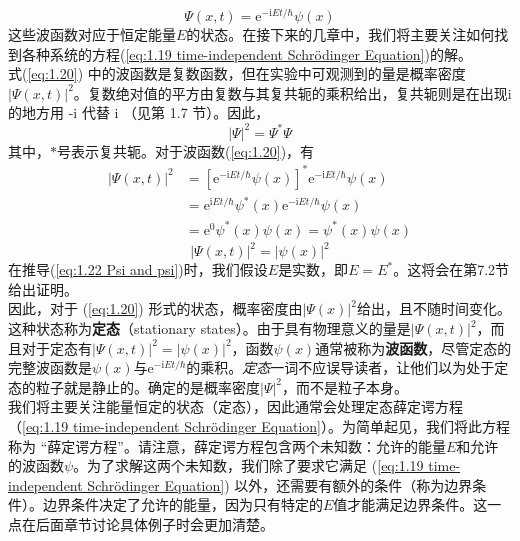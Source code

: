 	\begin{equation}
		\Psi\left(x,t\right)=\mathrm{e}^{-\mathrm{i}Et/\hbar}\psi\left(x\right)
		\label{eq:1.20}
	\end{equation}
	这些波函数对应于恒定能量$E$的状态。在接下来的几章中，我们将主要关注如何找到各种系统的方程(\ref{eq:1.19 time-independent Schrödinger Equation})的解。\\
	\indent 式(\ref{eq:1.20}) 中的波函数是复数函数，但在实验中可观测到的量是概率密度$\left|\Psi\left(x,t\right)\right|^2$。复数绝对值的平方由复数与其复共轭的乘积给出，复共轭则是在出现i的地方用 -i 代替 i （见第 1.7 节）。因此，
	\begin{equation}
		\boxed{\left|\Psi\right|^2=\Psi^{\ast}\Psi}
		\label{eq:1.21 square of Psi}
	\end{equation}
	其中，$\ast$号表示复共轭。对于波函数(\ref{eq:1.20})，有
	\begin{equation*}
		\begin{aligned}
			\left|\Psi\left(x,t\right)\right|^2 &=\left[\mathrm{e}^{-\mathrm{i}Et/\hbar}\psi\left(x\right)\right]^{\ast}\mathrm{e}^{-\mathrm{i}Et/\hbar}\psi\left(x\right)\\
			& = \mathrm{e}^{\mathrm{i}Et/\hbar}\psi^{\ast}\left(x\right)\mathrm{e}^{-\mathrm{i}Et/\hbar}\psi\left(x\right)\\
			& = \mathrm{e}^0\psi^{\ast}\left(x\right)\psi\left(x\right)=\psi^\ast\left(x\right)\psi\left(x\right)
		\end{aligned}
	\end{equation*}
	\begin{equation}
		\left|\Psi\left(x,t\right)\right|^2=\left|\psi\left(x\right)\right|^2
		\label{eq:1.22 Psi and psi}
	\end{equation}
	在推导(\ref{eq:1.22 Psi and psi})时，我们假设$E$是实数，即$E=E^{\ast}$。这将会在第7.2节给出证明。\\
	\indent 因此，对于 (\ref{eq:1.20}) 形式的状态，概率密度由$\left|\Psi\left(x\right)\right|^2$给出，且不随时间变化。这种状态称为\textbf{定态}（stationary states）。由于具有物理意义的量是$\left|\Psi\left(x,t\right)\right|^2$，而且对于定态有$\left|\Psi\left(x,t\right)\right|^2=\left|\psi\left(x\right)\right|^2$，函数$\psi\left(x\right)$通常被称为\textbf{波函数}，尽管定态的完整波函数是$\psi\left(x\right)$与$\mathrm{e}^{-\mathrm{i}Et/\hbar}$的乘积。\textit{定态}一词不应误导读者，让他们以为处于定态的粒子就是静止的。确定的是概率密度$\left|\Psi\right|^2$，而不是粒子本身。\\
	\indent 我们将主要关注能量恒定的状态（定态），因此通常会处理定态薛定谔方程（\ref{eq:1.19 time-independent Schrödinger Equation}）。为简单起见，我们将此方程称为 “薛定谔方程”。请注意，薛定谔方程包含两个未知数：允许的能量$E$和允许的波函数$ \psi$。为了求解这两个未知数，我们除了要求它满足 (\ref{eq:1.19 time-independent Schrödinger Equation}) 以外，还需要有额外的条件（称为边界条件）。边界条件决定了允许的能量，因为只有特定的$E$值才能满足边界条件。这一点在后面章节讨论具体例子时会更加清楚。
	
